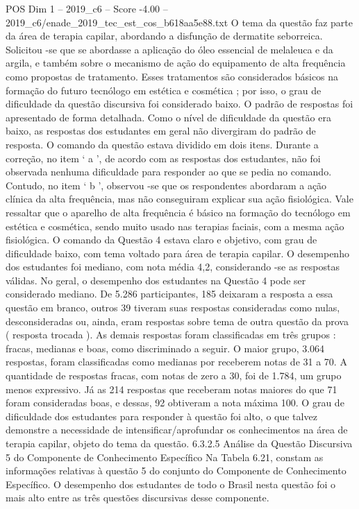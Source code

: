\begin{textsample}{POS Dim 1 – 2019\_c6 – Score -4.00 – 2019\_c6/enade\_2019\_tec\_est\_cos\_b618aa5e88.txt}
O tema da questão faz parte da área de terapia capilar, abordando a disfunção de dermatite seborreica.
Solicitou -se que se abordasse a aplicação do óleo essencial de melaleuca e da argila, e também sobre o mecanismo de ação do equipamento de alta frequência como propostas de tratamento.
Esses tratamentos são considerados básicos na formação do futuro tecnólogo em estética e cosmética ; por isso, o grau de dificuldade da questão discursiva foi considerado baixo.
O padrão de respostas foi apresentado de forma detalhada.
Como o nível de dificuldade da questão era baixo, as respostas dos estudantes em geral não divergiram do padrão de resposta.
O comando da questão estava dividido em dois itens.
Durante a correção, no item ‘ a ’, de acordo com as respostas dos estudantes, não foi observada nenhuma dificuldade para responder ao que se pedia no comando.
Contudo, no item ‘ b ’, observou -se que os respondentes abordaram a ação clínica da alta frequência, mas não conseguiram explicar sua ação fisiológica.
Vale ressaltar que o aparelho de alta frequência é básico na formação do tecnólogo em estética e cosmética, sendo muito usado nas terapias faciais, com a mesma ação fisiológica.
O comando da Questão 4 estava claro e objetivo, com grau de dificuldade baixo, com tema voltado para área de terapia capilar.
O desempenho dos estudantes foi mediano, com nota média 4,2, considerando -se as respostas válidas.
No geral, o desempenho dos estudantes na Questão 4 pode ser considerado mediano.
De 5.286 participantes, 185 deixaram a resposta a essa questão em branco, outros 39 tiveram suas respostas consideradas como nulas, desconsideradas ou, ainda, eram respostas sobre tema de outra questão da prova ( resposta trocada ).
As demais respostas foram classificadas em três grupos : fracas, medianas e boas, como discriminado a seguir.
O maior grupo, 3.064 respostas, foram classificadas como medianas por receberem notas de 31 a 70.
A quantidade de respostas fracas, com notas de zero a 30, foi de 1.784, um grupo menos expressivo.
Já as 214 respostas que receberam notas maiores do que 71 foram consideradas boas, e dessas, 92 obtiveram a nota máxima 100.
O grau de dificuldade dos estudantes para responder à questão foi alto, o que talvez demonstre a necessidade de intensificar/aprofundar os conhecimentos na área de terapia capilar, objeto do tema da questão. 6.3.2.5 Análise da Questão Discursiva 5 do Componente de Conhecimento Específico Na Tabela 6.21, constam as informações relativas à questão 5 do conjunto do Componente de Conhecimento Específico.
O desempenho dos estudantes de todo o Brasil nesta questão foi o mais alto entre as três questões discursivas desse componente.

\end{textsample}

